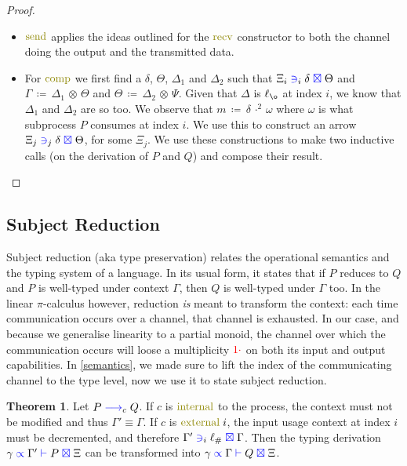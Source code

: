 \documentclass[a4paper,UKenglish,cleveref, autoref, thm-restate,authorcolumns]{lipics-v2019}
\theoremstyle{definition}
\newtheorem{nitheorem}[theorem]{Theorem}
\newcommand{\picalc}{$\pi$-calculus}
\newcommand{\type}[1]{\textcolor{blue}{\operatorname{#1}}}
\newcommand{\constr}[1]{\textcolor{olive}{\operatorname{#1}}}
\newcommand{\field}[1]{\textcolor{red}{\operatorname{#1}}}
\newcommand{\opsquared}[3]{#1 \, \coloneqq \, #2 \, \cdot^2 \, #3}
\newcommand{\opctx}[3]{#1 \, \coloneqq \, #2 \, \otimes \, #3}
\newcommand{\one}{\field{1\cdot}}
\newcommand{\lz}{\ell_{\o}}
\newcommand{\lio}{\ell_{\#}}
\newcommand{\reduce}[1]{\; \type{\longrightarrow}_{#1} \;}
\newcommand{\types}[4]{#1 \; \type{\propto} \; #2 \; \type{\vdash} \; #3 \; \type{\boxtimes} \; #4}
\newcommand{\containsusage}[4]{#1 \; \type{\ni}_{#2} \; #3 \; \type{\boxtimes} \; #4}
\begin{document}
\begin{proof}
\begin{itemize}
    \item
      $\constr{send}$ applies the ideas outlined for the $\constr{recv}$ constructor to both the channel doing the output and the transmitted data.

    \item
      For $\constr{comp}$ we first find a $\delta$, $\Theta$, $\Delta_1$ and $\Delta_2$ such that $\containsusage{\Xi_i}{i}{\delta}{\Theta}$ and $\opctx{\Gamma}{\Delta_1}{\Theta}$ and $\opctx{\Theta}{\Delta_2}{\Psi}$.
      Given that $\Delta$ is $\lz$ at index $i$, we know that $\Delta_1$ and $\Delta_2$ are so too.
      We observe that $\opsquared{m}{\delta}{\omega}$ where $\omega$ is what subprocess $P$ consumes at index $i$.
      We use this to construct an arrow $\containsusage{\Xi_j}{j}{\delta}{\Theta}$, for some $\Xi_j$.
      We use these constructions to make two inductive calls (on the derivation of $P$ and $Q$) and compose their result.
  \end{itemize}  
\end{proof}


\subsection{Subject Reduction}
\label{subject-reduction}

Subject reduction (aka type preservation) relates the operational semantics and the typing system of a language.
In its usual form, it states that if $P$ reduces to $Q$ and $P$ is well-typed under context $\Gamma$, then $Q$ is well-typed under $\Gamma$ too.
In the linear \picalc{} however, reduction \emph{is} meant to transform the context: each time communication occurs over a channel, that channel is exhausted.
In our case, and because we generalise linearity to a partial monoid, the channel over which the communication occurs will loose a multiplicity $\one$ on both its input and output capabilities.
In  \autoref{semantics}, we made sure to lift the index of the communicating channel to the type level, now we use it to state subject reduction.

\begin{nitheorem}
  Let $P \reduce{c} Q$.
  If $c$ is $\constr{internal}$ to the process, the context must not be modified and thus $\Gamma' \equiv \Gamma$.
  If $c$ is $\constr{external}\; i$, the input usage context at index $i$ must be decremented, and therefore $\containsusage{\Gamma'}{i}{\lio}{\Gamma}$.
  Then the typing derivation $\types{\gamma}{\Gamma'}{P}{\Xi}$ can be transformed into $\types{\gamma}{\Gamma}{Q}{\Xi}$.
\end{nitheorem}
\end{document}
